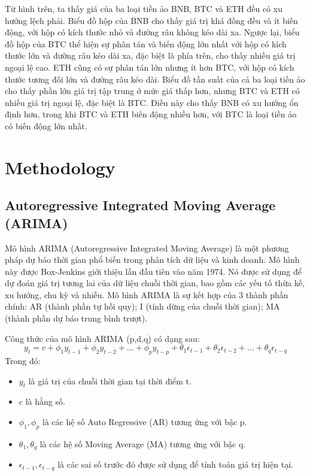 \documentclass[conference]{IEEEtran}
\begin{document}
Từ hình trên, ta thấy giá của ba loại tiền ảo BNB, BTC và ETH đều có xu hướng lệch phải. Biểu đồ hộp của BNB cho thấy giá trị khá đồng đều và ít biến động, với hộp có kích thước nhỏ và đường râu không kéo dài xa. Ngược lại, biểu đồ hộp của BTC thể hiện sự phân tán và biến động lớn nhất với hộp có kích thước lớn và đường râu kéo dài xa, đặc biệt là phía trên, cho thấy nhiều giá trị ngoại lệ cao. ETH cũng có sự phân tán lớn nhưng ít hơn BTC, với hộp có kích thước tương đối lớn và đường râu kéo dài. Biểu đồ tần suất của cả ba loại tiền ảo cho thấy phần lớn giá trị tập trung ở mức giá thấp hơn, nhưng BTC và ETH có nhiều giá trị ngoại lệ, đặc biệt là BTC. Điều này cho thấy BNB có xu hướng ổn định hơn, trong khi BTC và ETH biến động nhiều hơn, với BTC là loại tiền ảo có biến động lớn nhất.

\section{Methodology}
\subsection{Autoregressive Integrated Moving Average (ARIMA)}
Mô hình ARIMA (Autoregressive Integrated Moving Average) là một phương pháp dự báo thời gian phổ biến trong phân tích dữ liệu và kinh doanh. Mô hình này được Box-Jenkins giới thiệu lần đầu tiên vào năm 1974. Nó được sử dụng để dự đoán giá trị tương lai của dữ liệu chuỗi thời gian, bao gồm các yếu tố thừa kế, xu hướng, chu kỳ và nhiễu.
Mô hình ARIMA là sự kết hợp của 3 thành phần chính: AR (thành phần tự hồi quy); I (tính dừng của chuỗi thời gian); MA (thành phần dự báo trung bình trượt).

Công thức của mô hình ARIMA (p,d,q) có dạng sau:
\[
y_{t} = c + \phi_{1}y_{t-1} + \phi_{2}y_{t-2} + ... + \phi_{p}y_{t-p} + \theta_{1}\epsilon_{t-1} + \theta_{2}\epsilon_{t-2} + ... + \theta_{q}\epsilon_{t-q}
\]
Trong đó:
\begin{itemize}
    \item \(y_{t}\) là giá trị của chuỗi thời gian tại thời điểm t.
    \item c là hằng số.
    \item \(\phi_{1}, \phi_{p}\) là các hệ số Auto Regressive (AR) tương ứng với bậc p.
    \item \(\theta_{1}, \theta_{q}\) là các hệ số Moving Average (MA) tương ứng với bậc q.
    \item \(\epsilon_{t-1}, \epsilon_{t-q}\) là các sai số trước đó được sử dụng để tính toán giá trị hiện tại.
\end{itemize}
\end{document}
